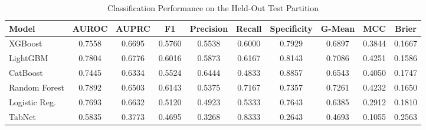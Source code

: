 \begin{table}
\centering
\caption{Classification Performance on the Held-Out Test Partition}
\label{tab:results}
\begin{tabular}{lccccccccc}
\toprule
Model & AUROC & AUPRC & F1 & Precision & Recall & Specificity & G-Mean & MCC & Brier \\
\midrule
XGBoost & 0.7558 & 0.6695 & 0.5760 & 0.5538 & 0.6000 & 0.7929 & 0.6897 & 0.3844 & 0.1667 \\
LightGBM & 0.7804 & 0.6776 & 0.6016 & 0.5873 & 0.6167 & 0.8143 & 0.7086 & 0.4251 & 0.1586 \\
CatBoost & 0.7445 & 0.6334 & 0.5524 & 0.6444 & 0.4833 & 0.8857 & 0.6543 & 0.4050 & 0.1747 \\
Random Forest & 0.7892 & 0.6503 & 0.6143 & 0.5375 & 0.7167 & 0.7357 & 0.7261 & 0.4232 & 0.1650 \\
Logistic Reg. & 0.7693 & 0.6632 & 0.5120 & 0.4923 & 0.5333 & 0.7643 & 0.6385 & 0.2912 & 0.1810 \\
TabNet & 0.5835 & 0.3773 & 0.4695 & 0.3268 & 0.8333 & 0.2643 & 0.4693 & 0.1055 & 0.2563 \\
\bottomrule
\end{tabular}
\end{table}

